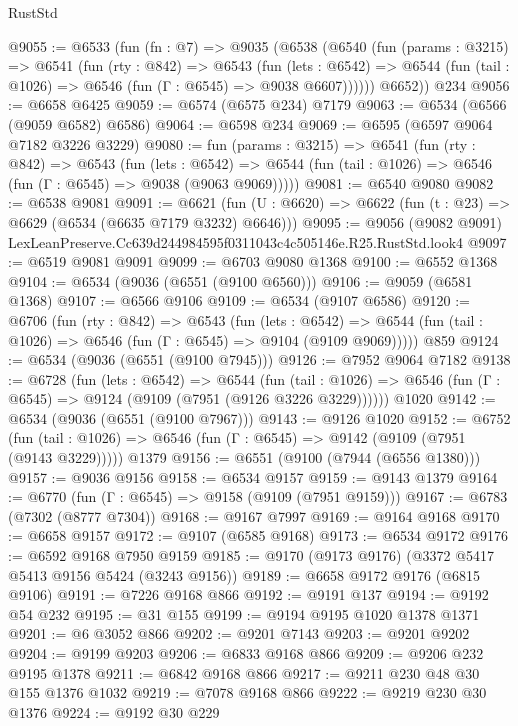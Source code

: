 \begin{lexlean}{RustStd}
\begin{coremodule}
@9055 := @6533
    (fun (fn : @7) =>
    @9035
      (@6538
        (@6540
          (fun (params : @3215) =>
          @6541
            (fun (rty : @842) =>
            @6543
              (fun (lets : @6542) =>
              @6544 (fun (tail : @1026) => @6546 (fun (Γ : @6545) => @9038 @6607))))))
        @6652))
    @234
@9056 := @6658 @6425
@9059 := @6574 (@6575 @234) @7179
@9063 := @6534 (@6566 (@9059 @6582) @6586)
@9064 := @6598 @234
@9069 := @6595 (@6597 @9064 @7182 @3226 @3229)
@9080 := fun (params : @3215) =>
  @6541
    (fun (rty : @842) =>
    @6543
      (fun (lets : @6542) =>
      @6544 (fun (tail : @1026) => @6546 (fun (Γ : @6545) => @9038 (@9063 @9069)))))
@9081 := @6540 @9080
@9082 := @6538 @9081
@9091 := @6621 (fun (U : @6620) => @6622 (fun (t : @23) => @6629 (@6534 (@6635 @7179 @3232) @6646)))
@9095 := @9056 (@9082 @9091) LexLeanPreserve.Cc639d244984595f0311043c4c505146e.R25.RustStd.look4
@9097 := @6519 @9081 @9091
@9099 := @6703 @9080 @1368
@9100 := @6552 @1368
@9104 := @6534 (@9036 (@6551 (@9100 @6560)))
@9106 := @9059 (@6581 @1368)
@9107 := @6566 @9106
@9109 := @6534 (@9107 @6586)
@9120 := @6706
    (fun (rty : @842) =>
    @6543
      (fun (lets : @6542) =>
      @6544 (fun (tail : @1026) => @6546 (fun (Γ : @6545) => @9104 (@9109 @9069)))))
    @859
@9124 := @6534 (@9036 (@6551 (@9100 @7945)))
@9126 := @7952 @9064 @7182
@9138 := @6728
    (fun (lets : @6542) =>
    @6544
      (fun (tail : @1026) => @6546 (fun (Γ : @6545) => @9124 (@9109 (@7951 (@9126 @3226 @3229))))))
    @1020
@9142 := @6534 (@9036 (@6551 (@9100 @7967)))
@9143 := @9126 @1020
@9152 := @6752
    (fun (tail : @1026) => @6546 (fun (Γ : @6545) => @9142 (@9109 (@7951 (@9143 @3229)))))
    @1379
@9156 := @6551 (@9100 (@7944 (@6556 @1380)))
@9157 := @9036 @9156
@9158 := @6534 @9157
@9159 := @9143 @1379
@9164 := @6770 (fun (Γ : @6545) => @9158 (@9109 (@7951 @9159)))
@9167 := @6783 (@7302 (@8777 @7304))
@9168 := @9167 @7997
@9169 := @9164 @9168
@9170 := @6658 @9157
@9172 := @9107 (@6585 @9168)
@9173 := @6534 @9172
@9176 := @6592 @9168 @7950 @9159
@9185 := @9170 (@9173 @9176) (@3372 @5417 @5413 @9156 @5424 (@3243 @9156))
@9189 := @6658 @9172 @9176 (@6815 @9106)
@9191 := @7226 @9168 @866
@9192 := @9191 @137
@9194 := @9192 @54 @232
@9195 := @31 @155
@9199 := @9194 @9195 @1020 @1378 @1371
@9201 := @6 @3052 @866
@9202 := @9201 @7143
@9203 := @9201 @9202
@9204 := @9199 @9203
@9206 := @6833 @9168 @866
@9209 := @9206 @232 @9195 @1378
@9211 := @6842 @9168 @866
@9217 := @9211 @230 @48 @30 @155 @1376 @1032
@9219 := @7078 @9168 @866
@9222 := @9219 @230 @30 @1376
@9224 := @9192 @30 @229

\end{coremodule}
\end{lexlean}
